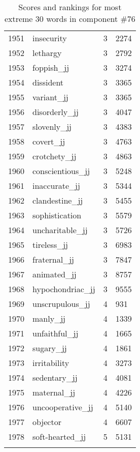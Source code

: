 \begin{longtable}[!htbp]{| rlr@{.}l |}
    1951 & insecurity & 3 & 2274 \\
    1952 & lethargy & 3 & 2792 \\
    1953 & foppish\_jj & 3 & 3274 \\
    1954 & dissident & 3 & 3365 \\
    1955 & variant\_jj & 3 & 3365 \\
    1956 & disorderly\_jj & 3 & 4047 \\
    1957 & slovenly\_jj & 3 & 4383 \\
    1958 & covert\_jj & 3 & 4763 \\
    1959 & crotchety\_jj & 3 & 4863 \\
    1960 & conscientious\_jj & 3 & 5248 \\
    1961 & inaccurate\_jj & 3 & 5344 \\
    1962 & clandestine\_jj & 3 & 5455 \\
    1963 & sophistication & 3 & 5579 \\
    1964 & uncharitable\_jj & 3 & 5726 \\
    1965 & tireless\_jj & 3 & 6983 \\
    1966 & fraternal\_jj & 3 & 7847 \\
    1967 & animated\_jj & 3 & 8757 \\
    1968 & hypochondriac\_jj & 3 & 9555 \\
    1969 & unscrupulous\_jj & 4 & 931 \\
    1970 & manly\_jj & 4 & 1339 \\
    1971 & unfaithful\_jj & 4 & 1665 \\
    1972 & sugary\_jj & 4 & 1861 \\
    1973 & irritability & 4 & 3273 \\
    1974 & sedentary\_jj & 4 & 4081 \\
    1975 & maternal\_jj & 4 & 4226 \\
    1976 & uncooperative\_jj & 4 & 5140 \\
    1977 & objector & 4 & 6607 \\
    1978 & soft-hearted\_jj & 5 & 5131 \\
    \hline
    \caption{Scores and rankings for most extreme 30 words in component \#76} \\
\end{longtable}
